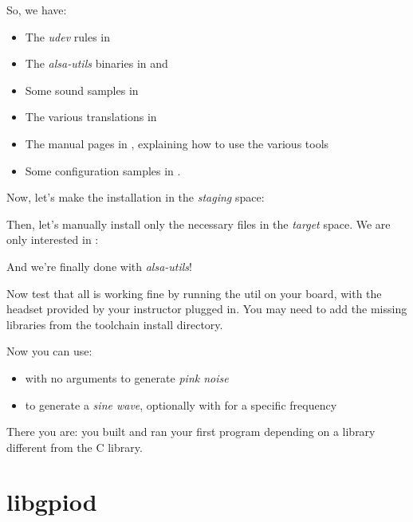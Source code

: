So, we have:
\begin{itemize}
\item The {\em udev} rules in 
\item The {\em alsa-utils} binaries in  and 
\item Some sound samples in 
\item The various translations in 
\item The manual pages in , explaining how to
  use the various tools
\item Some configuration samples in .
\end{itemize}

Now, let's make the installation in the {\em staging} space:


Then, let's manually install only the necessary files in the {\em target}
space. We are only interested in :


And we're finally done with {\em alsa-utils}!

Now test that all is working fine by running the  util on
your board, with the headset provided by your instructor plugged
in. You may need to add the missing libraries from the toolchain
install directory.

Now you can use:

\begin{itemize}

\item {} with no arguments to generate {\em pink noise}

\item {} to generate a {\em sine wave},
optionally with  for a specific frequency

\end{itemize}

There you are: you built and ran your first program depending
on a library different from the C library.

\section{libgpiod}

